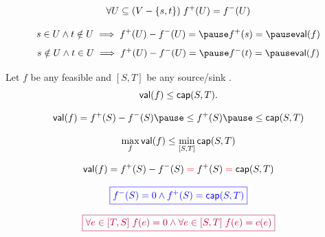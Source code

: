 \begin{frame}{}

  \pause
  \[
    \forall U \subseteq (V - \{s, t\})\; f^{+}(U) = f^{-}(U)
  \]

  \pause
  \[
    s \in U \land t \notin U \implies f^{+}(U) - f^{-}(U) = \pause f^{+}(s) = \pause \val(f)
  \]
  \pause
  \[
    s \notin U \land t \in U \implies f^{+}(U) - f^{-}(U) = \pause f^{-}(t) = \pause \val(f)
  \]
\end{frame}

\begin{frame}{}
  \begin{theorem}
    Let $f$ be any feasible  and $[S, T]$ be any source/sink .
    \[
      \textsf{val}(f) \le \textsf{cap}(S, T).
    \]
  \end{theorem}


  \pause
  \[
    \val(f) = f^{+}(S) - f^{-}(S) \pause \le f^{+}(S) \pause \le \capacity(S, T)
  \]
\end{frame}

\begin{frame}{}
  \begin{lemma}
    \[
      \max_{f} \textsf{val}(f) \le \min_{[S, T]} \textsf{cap}(S, T)
    \]
  \end{lemma}

  \pause
  \vspace{0.60cm}
  \begin{center}

    \pause
    \vspace{0.50cm}
  \end{center}
\end{frame}

\begin{frame}{}
  \[
    \textsf{val}(f) = f^{+}(S) - f^{-}(S) \;\textcolor{red}{=}\; f^{+}(S) \;\textcolor{red}{=}\; \textsf{cap}(S, T)
  \]

  \pause
  \[
    \textcolor{blue}{\boxed{f^{-}(S) = 0 \land f^{+}(S) = \textsf{cap}(S, T)}}
  \]

  \pause
  \[
    \textcolor{purple}{\boxed{\forall e \in [T, S]\; f(e) = 0 \land \forall e \in [S, T]\; f(e) = c(e)}}
  \]

\end{frame}

